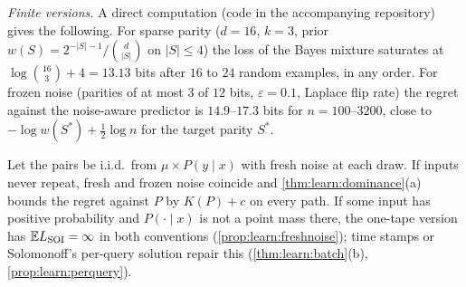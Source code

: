 \emph{Finite versions.} A direct computation (code in the accompanying repository) gives the following. For sparse parity ($d=16$, $k=3$, prior $w(S)=2^{-|S|-1}/\binom d{|S|}$ on $|S|\le4$) the loss of the Bayes mixture saturates at $\log\binom{16}3+4=13.13$ bits after $16$ to $24$ random examples, in any order. For frozen noise (parities of at most $3$ of $12$ bits, $\varepsilon=0.1$, Laplace flip rate) the regret against the noise-aware predictor is $14.9$--$17.3$ bits for $n=100$--$3200$, close to $-\log w(S^*)+\frac12\log n$ for the target parity $S^*$.

\begin{remark}\label{rem:ex:fresh}
Let the pairs be i.i.d.\ from $\mu\times P(y\mid x)$ with fresh noise at each draw. If inputs never repeat, fresh and frozen noise coincide and \cref{thm:learn:dominance}(a) bounds the regret against $P$ by $K(P)+c$ on every path. If some input has positive probability and $P(\cdot\mid x)$ is not a point mass there, the one-tape version has $\mathbb{E}L_{\mathrm{SOI}}=\infty$ in both conventions (\cref{prop:learn:freshnoise}); time stamps or Solomonoff's per-query solution repair this (\cref{thm:learn:batch}(b), \cref{prop:learn:perquery}).
\end{remark}

